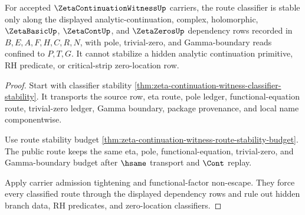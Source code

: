 \begin{theorem}
\label{thm:zeta-continuation-witness-route-classifier-stability}
For accepted $\ZetaContinuationWitnessUp$ carriers, the route classifier is stable only along the displayed analytic-continuation, complex, holomorphic, $\ZetaBasicUp$, $\ZetaContUp$, and $\ZetaZerosUp$ dependency rows recorded in $B,E,A,F,H,C,R,N$, with pole, trivial-zero, and Gamma-boundary reads confined to $P,T,G$. It cannot stabilize a hidden analytic continuation primitive, RH predicate, or critical-strip zero-location row.
\end{theorem}
\begin{proof}
Start with classifier stability \autoref{thm:zeta-continuation-witness-classifier-stability}. It transports the source row, eta route, pole ledger, functional-equation route, trivial-zero ledger, Gamma boundary, package provenance, and local name componentwise.

Use route stability budget \autoref{thm:zeta-continuation-witness-route-stability-budget}. The public route keeps the same eta, pole, functional-equation, trivial-zero, and Gamma-boundary budget after $\hsame$ transport and $\Cont$ replay.

Apply carrier admission tightening and functional-factor non-escape. They force every classified route through the displayed dependency rows and rule out hidden branch data, RH predicates, and zero-location classifiers.
\end{proof}

